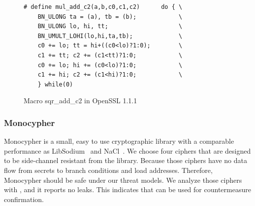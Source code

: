 \begin{figure}
    \centering
    \begin{lstlisting}[xleftmargin=.02\textwidth,xrightmargin=.01\textwidth]
# define mul_add_c2(a,b,c0,c1,c2)      do { \
    BN_ULONG ta = (a), tb = (b);            \
    BN_ULONG lo, hi, tt;                    \
    BN_UMULT_LOHI(lo,hi,ta,tb);             \
    c0 += lo; tt = hi+((c0<lo)?1:0);        \
    c1 += tt; c2 += (c1<tt)?1:0;            \
    c0 += lo; hi += (c0<lo)?1:0;            \
    c1 += hi; c2 += (c1<hi)?1:0;            \
    } while(0)
\end{lstlisting}
    \vspace*{-6pt}
    \caption{Macro \textsf{sqr\_add\_c2} in OpenSSL 1.1.1}
    \label{fig:new_sqr2}
    \vspace*{-10pt}
\end{figure}


\subsubsection{Monocypher}\label{eval:mono}
Monocypher is a small, easy to use cryptographic library with a
comparable performance as LibSodium~\cite{libsodium} and NaCl~\cite{bernstein2012security}. 
We choose four ciphers that are 
designed to be side-channel resistant from the library.
Because those ciphers have no 
data flow from secrets to branch conditions and load addresses.
Therefore, Monocypher should be safe under our threat models. 
We analyze those ciphers with \tool{}, and it reports no leaks.
This indicates that \tool{} can be used for countermeasure confirmation.


